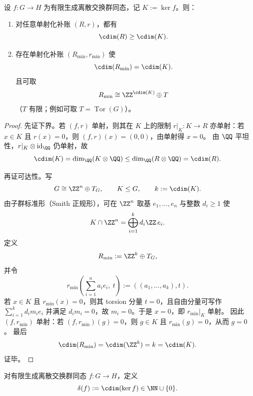 \begin{theorem}[最小圆维补账定理]\label{thm:xi-cdim-minimal-ledger-cost}
设 \(f:G\to H\) 为有限生成离散交换群同态，记 \(K:=\ker f\)。则：
\begin{enumerate}
  \item 对任意单射化补账 \((R,r)\)，都有
  \[
  \cdim(R)\ge \cdim(K).
  \]
  \item 存在单射化补账 \((R_{\min},r_{\min})\) 使
  \[
  \cdim(R_{\min})=\cdim(K).
  \]
  且可取
  \[
  R_{\min}\cong \ZZ^{\cdim(K)}\oplus T
  \]
  （\(T\) 有限；例如可取 \(T=\operatorname{Tor}(G)\)）。
\end{enumerate}
\end{theorem}
\begin{proof}
先证下界。若 \((f,r)\) 单射，则其在 \(K\) 上的限制 \(r|_K:K\to R\) 亦单射：若 \(x\in K\) 且 \(r(x)=0\)，则 \((f,r)(x)=(0,0)\)，由单射得 \(x=0\)。
由 \(\QQ\) 平坦性，\(r|_K\otimes\mathrm{id}_{\QQ}\) 仍单射，故
\[
\cdim(K)=\dim_{\QQ}(K\otimes\QQ)\le \dim_{\QQ}(R\otimes\QQ)=\cdim(R).
\]

再证可达性。写
\[
G\cong \ZZ^n\oplus T_G,\qquad K\le G,\qquad k:=\cdim(K).
\]
由子群标准形（Smith 正规形），可在 \(\ZZ^n\) 取基 \(e_1,\dots,e_n\) 与整数 \(d_i\ge 1\) 使
\[
K\cap \ZZ^n=\bigoplus_{i=1}^{k} d_i\ZZ\,e_i.
\]
定义
\[
R_{\min}:=\ZZ^k\oplus T_G,
\]
并令
\[
r_{\min}\!\left(\sum_{i=1}^n a_i e_i,\ t\right):=((a_1,\dots,a_k),t).
\]
若 \(x\in K\) 且 \(r_{\min}(x)=0\)，则其 torsion 分量 \(t=0\)，且自由分量可写作
\(
\sum_{i=1}^k d_i m_i e_i
\)
并满足 \(d_i m_i=0\)，故 \(m_i=0\)。于是 \(x=0\)，即 \(r_{\min}|_K\) 单射。
因此 \((f,r_{\min})\) 单射：若 \((f,r_{\min})(g)=0\)，则 \(g\in K\) 且 \(r_{\min}(g)=0\)，从而 \(g=0\)。
最后
\[
\cdim(R_{\min})=\cdim(\ZZ^k)=k=\cdim(K).
\]
证毕。
\end{proof}

\begin{definition}[圆维缺陷]\label{def:xi-cdim-defect}
对有限生成离散交换群同态 \(f:G\to H\)，定义
\[
\delta(f):=\cdim(\ker f)\in\NN\cup\{0\}.
\]
\end{definition}

